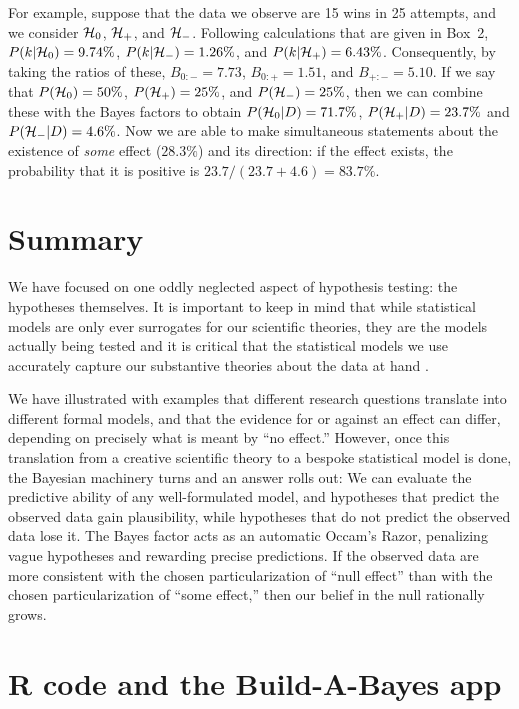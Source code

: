 \begin{tcolorbox}[title=Box~1: Evaluating more than two hypotheses at once,code={\singlespacing}]
For example, suppose that the data we observe are 15 wins in 25 attempts, and we consider ${\mathcal{H}}_0$, ${\mathcal{H}}_+$, and ${\mathcal{H}}_-$.  Following calculations that are given in Box~2, $P(k|{\mathcal{H}}_0) = 9.74\%$, $P(k|{\mathcal{H}}_-) = 1.26\%$, and $P(k|{\mathcal{H}}_+) = 6.43\%$.  Consequently, by taking the ratios of these, $B_{0:-}=7.73$, $B_{0:+}=1.51$, and $B_{+:-}=5.10$.  If we say that $P({\mathcal{H}}_0) = 50\%$, $P({\mathcal{H}}_+) = 25\%$, and $P({\mathcal{H}}_-) = 25\%$, then we can combine these with the Bayes factors to obtain $P({\mathcal{H}}_0 | D) = 71.7\%$, $P({\mathcal{H}}_+ | D) = 23.7\%$ and $P({\mathcal{H}}_- | D) = 4.6\%$.  Now we are able to make simultaneous statements about the existence of \emph{some} effect ($28.3\%$) and its direction: if the effect exists, the probability that it is positive is $23.7/(23.7+4.6) = 83.7\%$.
\end{tcolorbox}
\section*{Summary}
We have focused on one oddly neglected aspect of hypothesis testing: the hypotheses themselves.  It is important to keep in mind that while statistical models are only ever surrogates for our scientific theories, they are the models actually being tested and it is critical that the statistical models we use accurately capture our substantive theories about the data at hand \cite<see also>{rouder2017theories,Vanpaemel:2010}.

We have illustrated with examples that different research questions translate into different formal models, and that the evidence for or against an effect can differ, depending on precisely what is meant by ``no effect.'' However, once this translation from a creative scientific theory to a bespoke statistical model is done, the Bayesian machinery turns and an answer rolls out: We can evaluate the predictive ability of any well-formulated model, and hypotheses that predict the observed data gain plausibility, while hypotheses that do not predict the observed data lose it. {The Bayes factor acts as an automatic Occam's Razor, penalizing vague hypotheses and rewarding precise predictions.} If the observed data are more consistent with the chosen particularization of ``null effect'' than with the chosen particularization of ``some effect,'' then our belief in the null rationally grows.

\section*{R code and the Build-A-Bayes app}

